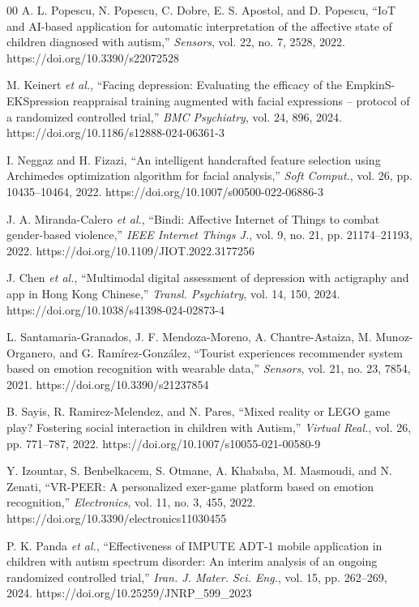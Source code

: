 \documentclass{ieeeaccess}
\begin{document}
\begin{thebibliography}{00}
		 A. L. Popescu, N. Popescu, C. Dobre, E. S. Apostol, and D. Popescu, ``IoT and AI-based application for automatic interpretation of the affective state of children diagnosed with autism,'' \emph{Sensors}, vol. 22, no. 7, 2528, 2022. https://doi.org/10.3390/s22072528
		
		 M. Keinert \emph{et al.}, ``Facing depression: Evaluating the efficacy of the EmpkinS-EKSpression reappraisal training augmented with facial expressions -- protocol of a randomized controlled trial,'' \emph{BMC Psychiatry}, vol. 24, 896, 2024. https://doi.org/10.1186/s12888-024-06361-3
		
		 I. Neggaz and H. Fizazi, ``An intelligent handcrafted feature selection using Archimedes optimization algorithm for facial analysis,'' \emph{Soft Comput.}, vol. 26, pp. 10435--10464, 2022. https://doi.org/10.1007/s00500-022-06886-3
		
		 J. A. Miranda-Calero \emph{et al.}, ``Bindi: Affective Internet of Things to combat gender-based violence,'' \emph{IEEE Internet Things J.}, vol. 9, no. 21, pp. 21174--21193, 2022. https://doi.org/10.1109/JIOT.2022.3177256
		
		 J. Chen \emph{et al.}, ``Multimodal digital assessment of depression with actigraphy and app in Hong Kong Chinese,'' \emph{Transl. Psychiatry}, vol. 14, 150, 2024. https://doi.org/10.1038/s41398-024-02873-4
		
		 L. Santamaria-Granados, J. F. Mendoza-Moreno, A. Chantre-Astaiza, M. Munoz-Organero, and G. Ramírez-González, ``Tourist experiences recommender system based on emotion recognition with wearable data,'' \emph{Sensors}, vol. 21, no. 23, 7854, 2021. https://doi.org/10.3390/s21237854
		
		 B. Sayis, R. Ramirez-Melendez, and N. Pares, ``Mixed reality or LEGO game play? Fostering social interaction in children with Autism,'' \emph{Virtual Real.}, vol. 26, pp. 771--787, 2022. https://doi.org/10.1007/s10055-021-00580-9
		
		 Y. Izountar, S. Benbelkacem, S. Otmane, A. Khababa, M. Masmoudi, and N. Zenati, ``VR-PEER: A personalized exer-game platform based on emotion recognition,'' \emph{Electronics}, vol. 11, no. 3, 455, 2022. https://doi.org/10.3390/electronics11030455
		
		 P. K. Panda \emph{et al.}, ``Effectiveness of IMPUTE ADT-1 mobile application in children with autism spectrum disorder: An interim analysis of an ongoing randomized controlled trial,'' \emph{Iran. J. Mater. Sci. Eng.}, vol. 15, pp. 262--269, 2024. https://doi.org/10.25259/JNRP\_599\_2023
		

\end{thebibliography}
\end{document}
